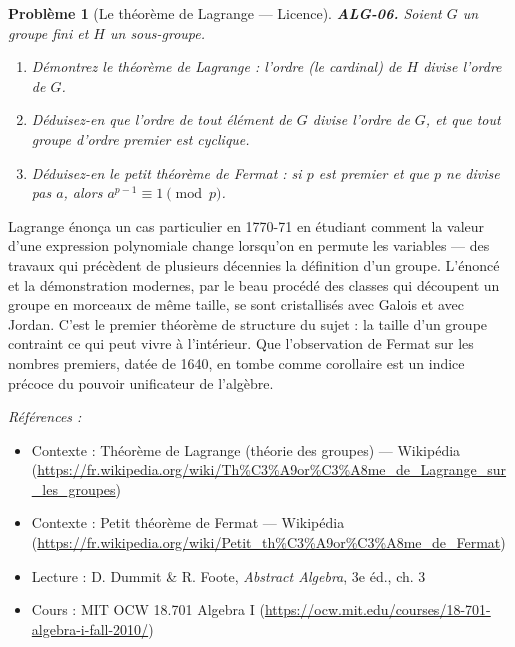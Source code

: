 \documentclass[11pt]{article}
\newtheorem{problem}{Problème}
\newenvironment{refs}{\par\small\noindent\emph{Références :}\begin{itemize}\setlength\itemsep{0pt}}{\end{itemize}\normalsize}
\begin{document}
\bigskip

\begin{problem}[{Le théorème de Lagrange --- Licence}]
\textbf{ALG-06.} Soient $G$ un groupe fini et $H$ un sous-groupe.
\begin{enumerate}
\item[(i)] Démontrez
le théorème de Lagrange : l'ordre (le cardinal) de $H$ divise l'ordre de $G$.
\item[(ii)] Déduisez-en que
l'ordre de tout élément de $G$ divise l'ordre de $G$, et que tout groupe d'ordre premier est
cyclique.
\item[(iii)] Déduisez-en le petit théorème de Fermat : si $p$ est premier et que $p$ ne divise pas $a$,
alors $a^{p-1} \equiv 1 \pmod{p}$.
\end{enumerate}

\end{problem}

\noindent Lagrange énonça un cas particulier en 1770-71 en étudiant comment la valeur d'une
expression polynomiale change lorsqu'on en permute les variables --- des travaux qui précèdent de plusieurs
décennies la définition d'un groupe. L'énoncé et la démonstration modernes, par le beau procédé des classes
qui découpent un groupe en morceaux de même taille, se sont cristallisés avec Galois et avec Jordan. C'est le
premier théorème de structure du sujet : la taille d'un groupe contraint ce qui peut vivre à l'intérieur. Que
l'observation de Fermat sur les nombres premiers, datée de 1640, en tombe comme corollaire est un indice
précoce du pouvoir unificateur de l'algèbre.

\begin{refs}
\item Contexte : Théorème de Lagrange (théorie des groupes) --- Wikipédia (\url{https://fr.wikipedia.org/wiki/Th%C3%A9or%C3%A8me_de_Lagrange_sur_les_groupes})
\item Contexte : Petit théorème de Fermat --- Wikipédia (\url{https://fr.wikipedia.org/wiki/Petit_th%C3%A9or%C3%A8me_de_Fermat})
\item Lecture : D. Dummit \& R. Foote, \textit{Abstract Algebra}, 3e éd., ch. 3
\item Cours : MIT OCW 18.701 Algebra I (\url{https://ocw.mit.edu/courses/18-701-algebra-i-fall-2010/})
\end{refs}

\bigskip
\end{document}
